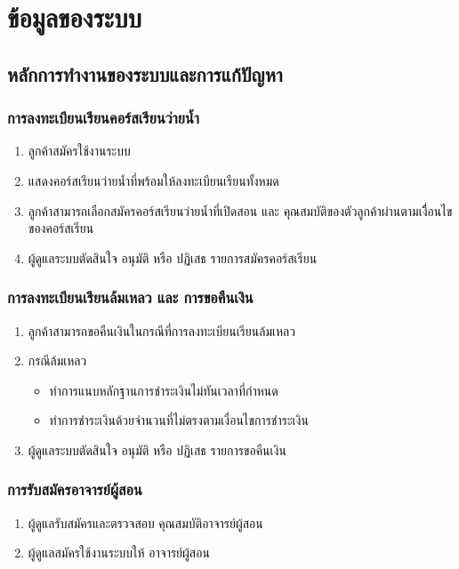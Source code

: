 \section{ข้อมูลของระบบ}

\subsection{หลักการทำงานของระบบและการแก้ปัญหา}

\subsubsection{การลงทะเบียนเรียนคอร์สเรียนว่ายนํ้า}

\begin{enumerate}
    \item ลูกค้าสมัครใช้งานระบบ
    \item แสดงคอร์สเรียนว่ายนํ้าที่พร้อมให้ลงทะเบียนเรียนทั้งหมด
    \item ลูกค้าสามารถเลือกสมัครคอร์สเรียนว่ายนํ้าที่เปิดสอน และ คุณสมบัติของตัวลูกค้าผ่านตามเงิื่อนไขของคอร์สเรียน
    \item ผู้ดูแลระบบตัดสินใจ อนุมัติ หรือ ปฏิเสธ รายการสมัครคอร์สเรียน
\end{enumerate}

\subsubsection{การลงทะเบียนเรียนล้มเหลว และ การขอคืนเงิน}

\begin{enumerate}
    \item ลูกค้าสามารถขอคืนเงินในกรณีที่การลงทะเบียนเรียนล้มเหลว
    \item กรณีล้มเหลว
        \begin{itemize}
            \item ทำการแนบหลักฐานการชำระเงินไม่ทันเวลาที่กำหนด
            \item ทำการชำระเงินด้วยจำนวนที่ไม่ตรงตามเงื่อนไขการชำระเงิน
        \end{itemize}
    \item ผู้ดูแลระบบตัดสินใจ อนุมัติ หรือ ปฏิเสธ รายการขอคืนเงิน
\end{enumerate}

\subsubsection{การรับสมัครอาจารย์ผู้สอน}

\begin{enumerate}
    \item ผู้ดูแลรับสมัครและตรวจสอบ คุณสมบัติอาจารย์ผู้สอน
    \item ผู้ดูแลสมัครใช้งานระบบให้ อาจารย์ผู้สอน
\end{enumerate}

